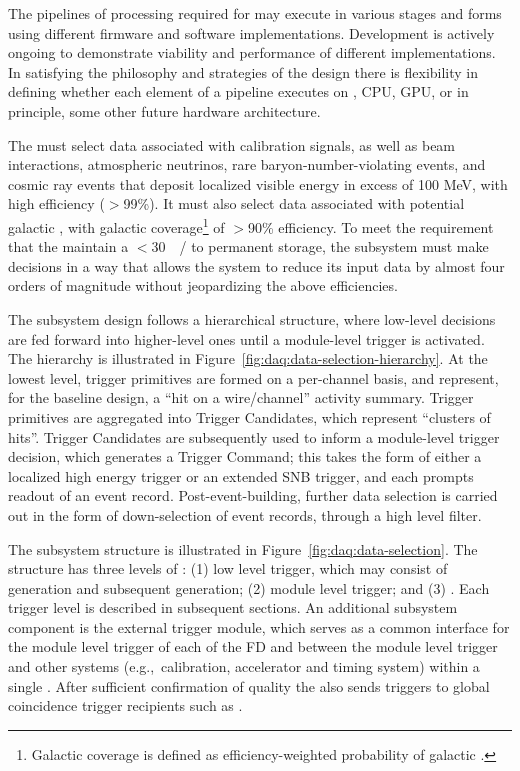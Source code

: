 The pipelines of processing required for  may execute in
various stages and forms using different firmware and software
implementations. 
Development is actively ongoing to demonstrate
viability and performance of different implementations. In satisfying
the philosophy and strategies of the  design there is 
flexibility in defining whether each element of a pipeline executes on
, CPU, GPU, or in principle, some other future hardware
architecture. 

The  must select data associated with calibration
signals, as well as beam interactions,
atmospheric neutrinos, rare baryon-number-violating events, and cosmic
ray events that deposit localized visible energy in excess of 100 MeV, with high efficiency ($>$99\%). 
It must also select data associated with potential galactic , with galactic coverage\footnote{Galactic coverage is defined as efficiency-weighted probability of galactic .} of $>$90\% efficiency.
To meet the requirement that the   maintain a
$<$\SI{30}{\peta\byte/\year} to permanent storage, the 
subsystem must make  decisions in a way that allows the  
system to reduce its input data by almost four orders of magnitude
without jeopardizing the above efficiencies.

The  subsystem design follows a hierarchical structure, where low-level
decisions are fed forward into higher-level ones until a  module-level trigger is activated. The hierarchy
is illustrated in Figure~\ref{fig:daq:data-selection-hierarchy}. 
At the lowest level, trigger
primitives are formed on a per-channel basis, and represent, for the
baseline design, a ``hit on
a wire/channel'' activity summary. Trigger primitives are aggregated
into Trigger Candidates, which represent ``clusters of hits''. Trigger
Candidates are subsequently used to inform a module-level trigger decision, which
generates a Trigger Command; this takes the form of either a localized high energy
trigger or an extended SNB trigger, and each prompts readout of an
event record. Post-event-building, further data selection is carried
out in the form of down-selection of event records, through a high
level filter. 

The subsystem structure is illustrated in
Figure~\ref{fig:daq:data-selection}. The structure
has three levels of : (1) low level trigger, which may consist of
 generation and subsequent
 generation; (2) module level trigger; and (3)
. Each trigger level is described in subsequent
sections. An additional subsystem component is the external trigger module,
which serves as a common interface for the
module level trigger of each of the FD  and between
the module level trigger and other systems (e.g.,~calibration,
accelerator and timing system) within a single
. After sufficient confirmation of quality the
 also sends  triggers
to global coincidence trigger recipients such as  .

